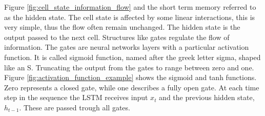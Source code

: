 
Figure \ref{fig:cell_state_information_flow} and the short term memory referred to as the hidden state. The cell state is affected by some linear interactions, this is very simple, thus the flow often remain unchanged. The hidden state is the output passed to the next cell. Structures like gates regulate the flow of information. The gates are neural networks layers with a particular activation function. It is called sigmoid function, named after the greek letter sigma, shaped like an S. Truncating the output from the gates to range between zero and one. Figure \ref{fig:activation_function_example} shows the sigmoid and tanh functions. Zero represents a closed gate, while one describes a fully open gate. At each time step in the sequence the LSTM receives input $x_t$ and the previous hidden state, $h_{t-1}$. These are passed trough all gates. %

